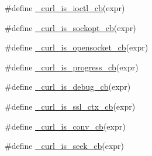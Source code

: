 \begin{DoxyCompactItemize}
\#define \hyperlink{typecheck-gcc_8h_a343634078b6083aacab216927bd5bfd3}{\+\_\+curl\+\_\+is\+\_\+ioctl\+\_\+cb}(expr)
\item 
\#define \hyperlink{typecheck-gcc_8h_aee6cc642016be3742e3dd2fee0c7a107}{\+\_\+curl\+\_\+is\+\_\+sockopt\+\_\+cb}(expr)
\item 
\#define \hyperlink{typecheck-gcc_8h_a128331b4b1d5b537099b020fcc383af1}{\+\_\+curl\+\_\+is\+\_\+opensocket\+\_\+cb}(expr)
\item 
\#define \hyperlink{typecheck-gcc_8h_aed3dfc6abebb81de797621133fb4cb5e}{\+\_\+curl\+\_\+is\+\_\+progress\+\_\+cb}(expr)
\item 
\#define \hyperlink{typecheck-gcc_8h_a7bdfeab77393e9925ff74f6c19b838b1}{\+\_\+curl\+\_\+is\+\_\+debug\+\_\+cb}(expr)
\item 
\#define \hyperlink{typecheck-gcc_8h_af3824227ed3542cf9d7879f36de5de9d}{\+\_\+curl\+\_\+is\+\_\+ssl\+\_\+ctx\+\_\+cb}(expr)
\item 
\#define \hyperlink{typecheck-gcc_8h_acae13d0a890cf86e9dd8af64d648e190}{\+\_\+curl\+\_\+is\+\_\+conv\+\_\+cb}(expr)
\item 
\#define \hyperlink{typecheck-gcc_8h_ae7b2e1695c5aa009cab8486e76e7040b}{\+\_\+curl\+\_\+is\+\_\+seek\+\_\+cb}(expr)
\end{DoxyCompactItemize}
